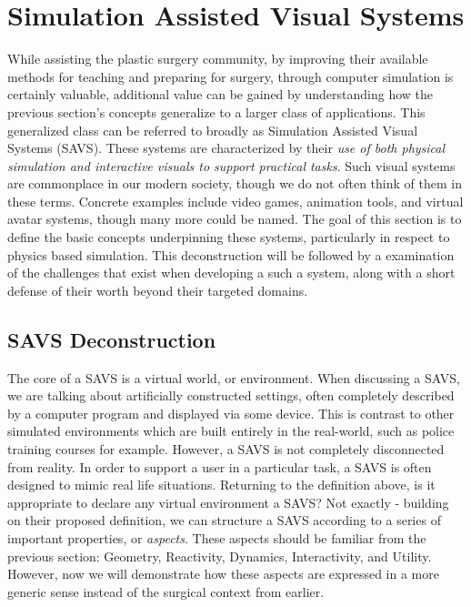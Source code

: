 

\section{Simulation Assisted Visual Systems}

While assisting the plastic surgery community, by improving their
available methods for teaching and preparing for surgery, through
computer simulation is certainly valuable, additional value can be
gained by understanding how the previous section's concepts generalize
to a larger class of applications. This generalized class can be
referred to broadly as Simulation Assisted Visual Systems
(SAVS). These systems are characterized by their \textit{use of both physical
simulation and interactive visuals to support practical tasks}. Such
visual systems are commonplace in our modern society, though we do
not often think of them in these terms. Concrete examples include
video games, animation tools, and virtual avatar systems, though many
more could be named. The goal of this section is to define the basic
concepts underpinning these systems, particularly in respect to physics
based simulation. This deconstruction will be followed by a
examination of the challenges that exist when developing a such a system,
along with a short defense of their worth beyond their targeted
domains.

\subsection{SAVS Deconstruction}

The core of a SAVS is a virtual world, or environment. When discussing
a SAVS, we are talking about artificially constructed settings, often
completely described by a computer program and displayed via some
device. This is contrast to other simulated environments which are
built entirely in the real-world, such as police training courses for
example. However, a SAVS is not completely disconnected from
reality. In order to support a user in a particular task, a SAVS is
often designed to mimic real life situations. Returning to the
definition above, is it appropriate to declare any virtual environment
a SAVS? Not exactly - building on their proposed definition, we can
structure a SAVS according to a series of important properties, or
\textit{aspects}. These aspects should be familiar from the previous
section: Geometry, Reactivity, Dynamics, Interactivity, and
Utility. However, now we will demonstrate how these aspects are
expressed in a more generic sense instead of the surgical context from
earlier.


